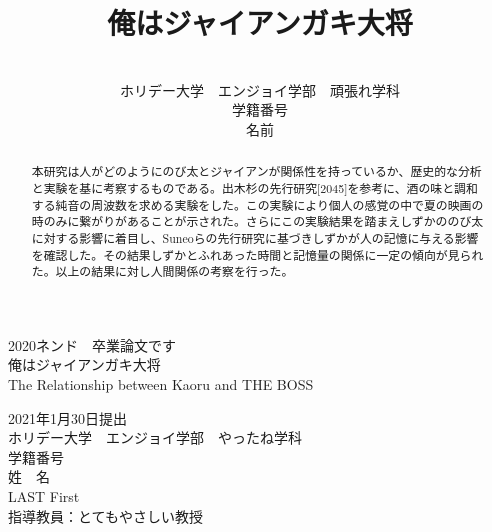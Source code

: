 \documentclass[uplatex,a4paper,10.5pt]{jsreport}
\title{ \Large 俺はジャイアンガキ大将}
\author{\\ホリデー大学　エンジョイ学部　頑張れ学科\\学籍番号\\名前}
\date{}
\begin{document}
\begin{titlepage}

\begin{center}
\vspace*{100truept}
{\Large 2020ネンド　卒業論文です}\\
\vspace{50truept}
{\huge 俺はジャイアンガキ大将}\\ %
\vspace{10truept}
{\large The Relationship between Kaoru and THE BOSS}\\ %
\vspace{60truept}

{\Large 2021年1月30日提出}\\ %
\vspace{60truept}
{\Large ホリデー大学　エンジョイ学部　やったね学科}\\
{\Large 学籍番号}\\
{\Large 姓　名}\\ %
{\Large LAST First}\\ %

\vspace{60truept}
{\large
指導教員：とてもやさしい教授\\
}
\end{center}

\end{titlepage}


\begin{abstract}
本研究は人がどのようにのび太とジャイアンが関係性を持っているか、歴史的な分析と実験を基に考察するものである。出木杉の先行研究[2045]を参考に、酒の味と調和する純音の周波数を求める実験をした。この実験により個人の感覚の中で夏の映画の時のみに繋がりがあることが示された。さらにこの実験結果を踏まえしずかののび太に対する影響に着目し、Suneoらの先行研究に基づきしずかが人の記憶に与える影響を確認した。その結果しずかとふれあった時間と記憶量の関係に一定の傾向が見られた。以上の結果に対し人間関係の考察を行った。
\end{abstract}
\end{document}

